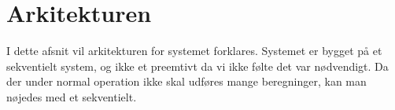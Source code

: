 \section{Arkitekturen}

I dette afsnit vil arkitekturen for systemet forklares. Systemet er bygget på et sekventielt system, og ikke et preemtivt da vi ikke følte det var nødvendigt. Da der under normal operation ikke skal udføres mange beregninger, kan man nøjedes med et sekventielt. \\